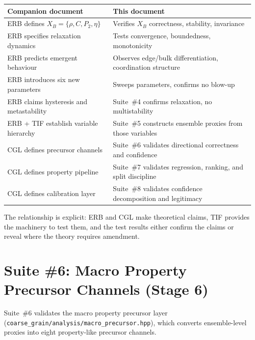 \documentclass[11pt]{article}
\newcommand{\file}[1]{\texttt{#1}}
\begin{document}
\begin{center}
\begin{tabular}{ll}
    \textbf{Companion document} & \textbf{This document} \\
    \midrule
    ERB defines $X_B = \{\rho, C, P_2, \eta\}$
        & Verifies $X_B$ correctness, stability, invariance \\
    ERB specifies relaxation dynamics
        & Tests convergence, boundedness, monotonicity \\
    ERB predicts emergent behaviour
        & Observes edge/bulk differentiation, coordination structure \\
    ERB introduces six new parameters
        & Sweeps parameters, confirms no blow-up \\
    ERB claims hysteresis and metastability
        & Suite~\#4 confirms relaxation, no multistability \\
    ERB + TIF establish variable hierarchy
        & Suite~\#5 constructs ensemble proxies from those variables \\
    CGL defines precursor channels
        & Suite~\#6 validates directional correctness and confidence \\
    CGL defines property pipeline
        & Suite~\#7 validates regression, ranking, and split discipline \\
    CGL defines calibration layer
        & Suite~\#8 validates confidence decomposition and legitimacy \\
\end{tabular}
\end{center}

The relationship is explicit: ERB and CGL make theoretical claims, TIF
provides the machinery to test them, and the test results either
confirm the claims or reveal where the theory requires amendment.

\section{Suite \#6: Macro Property Precursor Channels (Stage 6)}
\label{sec:suite6}

Suite~\#6 validates the macro property precursor layer
(\file{coarse\_grain/analysis/macro\_precursor.hpp}), which converts
ensemble-level proxies into eight property-like precursor channels.
\end{document}
